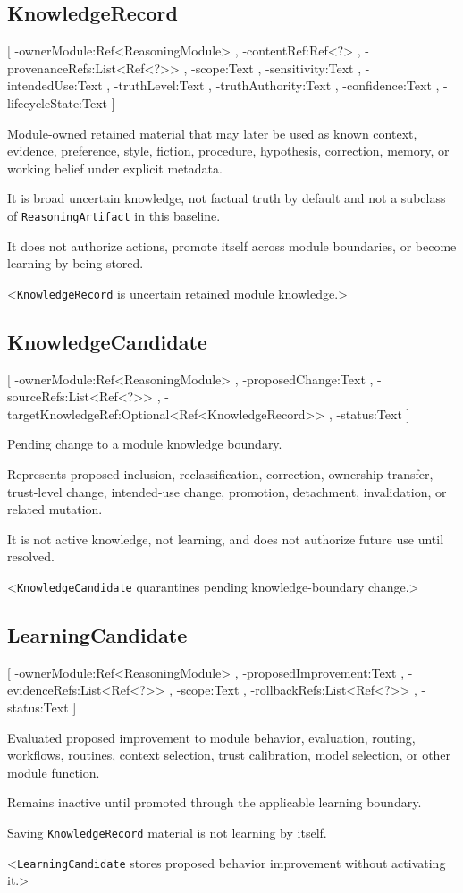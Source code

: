 \documentclass[11pt]{report}
\begin{document}
\subsection{KnowledgeRecord}
[
	\UMLAt-ownerModule:Ref<ReasoningModule> ,
	\UMLAt-contentRef:Ref<?> ,
	\UMLAt-provenanceRefs:List<Ref<?>> ,
	\UMLAt-scope:Text ,
	\UMLAt-sensitivity:Text ,
	\UMLAt-intendedUse:Text ,
	\UMLAt-truthLevel:Text ,
	\UMLAt-truthAuthority:Text ,
	\UMLAt-confidence:Text ,
	\UMLAt-lifecycleState:Text
]{%
	\item[] Module-owned retained material that may later be used as known context, evidence, preference, style, fiction, procedure, hypothesis, correction, memory, or working belief under explicit metadata.
	\item[] It is broad uncertain knowledge, not factual truth by default and not a subclass of \texttt{ReasoningArtifact} in this baseline.
	\item[] It does not authorize actions, promote itself across module boundaries, or become learning by being stored.
}<\texttt{KnowledgeRecord} is uncertain retained module knowledge.>

\subsection{KnowledgeCandidate}
[
	\UMLAt-ownerModule:Ref<ReasoningModule> ,
	\UMLAt-proposedChange:Text ,
	\UMLAt-sourceRefs:List<Ref<?>> ,
	\UMLAt-targetKnowledgeRef:Optional<Ref<KnowledgeRecord>> ,
	\UMLAt-status:Text
]{%
	\item[] Pending change to a module knowledge boundary.
	\item[] Represents proposed inclusion, reclassification, correction, ownership transfer, trust-level change, intended-use change, promotion, detachment, invalidation, or related mutation.
	\item[] It is not active knowledge, not learning, and does not authorize future use until resolved.
}<\texttt{KnowledgeCandidate} quarantines pending knowledge-boundary change.>

\subsection{LearningCandidate}
[
	\UMLAt-ownerModule:Ref<ReasoningModule> ,
	\UMLAt-proposedImprovement:Text ,
	\UMLAt-evidenceRefs:List<Ref<?>> ,
	\UMLAt-scope:Text ,
	\UMLAt-rollbackRefs:List<Ref<?>> ,
	\UMLAt-status:Text
]{%
	\item[] Evaluated proposed improvement to module behavior, evaluation, routing, workflows, routines, context selection, trust calibration, model selection, or other module function.
	\item[] Remains inactive until promoted through the applicable learning boundary.
	\item[] Saving \texttt{KnowledgeRecord} material is not learning by itself.
}<\texttt{LearningCandidate} stores proposed behavior improvement without activating it.>
\end{document}
